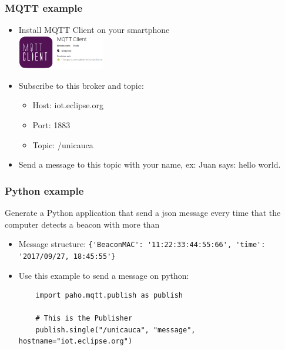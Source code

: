 \documentclass{beamer}
\begin{document}
\begin{frame}%
\frametitle{MQTT example}
\begin{itemize}
	\item Install MQTT Client on your smartphone\\
	\includegraphics[width=0.3\textwidth]{./figures/apk.eps}
	\item Subscribe to this broker and topic:
	\begin{itemize}
		\item Host: iot.eclipse.org
		\item Port: 1883
		\item Topic: /unicauca
	\end{itemize} 
	\item Send a message to this topic with your name, ex: Juan says: hello world.  
\end{itemize}
\end{frame} %

\begin{frame}[fragile]
\frametitle{Python example}
Generate a Python application that send a json message every time that the computer detects a beacon with more than 
\begin{itemize}
	\item Message structure: \newline\verb|{'BeaconMAC': '11:22:33:44:55:66', 'time': '2017/09/27, 18:45:55'}|
	\item Use this example to send a message on python:
	\begin{verbatim}
	import paho.mqtt.publish as publish

	# This is the Publisher
	publish.single("/unicauca", "message", hostname="iot.eclipse.org")
	
	\end{verbatim}
\end{itemize}
\end{frame}
\end{document}
